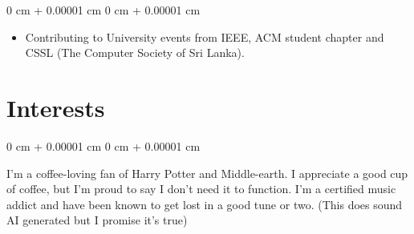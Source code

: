 \documentclass[10pt, letterpaper]{article}
\newenvironment{highlights}{
    \begin{itemize}[
        topsep=0.10 cm,
        parsep=0.10 cm,
        partopsep=0pt,
        itemsep=0pt,
        leftmargin=0 cm + 10pt
    ]
}{
    \end{itemize}
} %
\newenvironment{onecolentry}{
    \begin{adjustwidth}{
        0 cm + 0.00001 cm
    }{
        0 cm + 0.00001 cm
    }
}{
    \end{adjustwidth}
} %
\newenvironment{twocolentry}[2][]{
    \onecolentry
    \def\secondColumn{#2}
    \setcolumnwidth{\fill, 6.5 cm}
    \begin{paracol}{2}
}{
    \switchcolumn \raggedleft \secondColumn
    \end{paracol}
    \endonecolentry
} %
\begin{document}
\begin{twocolentry} {
    
}
    \begin{highlights}
        \item Contributing to University events from IEEE, ACM student chapter and CSSL (The Computer Society of Sri Lanka).
    \end{highlights}
\end{twocolentry}

\section{Interests}



        
        \begin{onecolentry}
            I'm a coffee-loving fan of Harry Potter and Middle-earth. I appreciate a good cup of
coffee, but I'm proud to say I don't need it to function. I'm a certified music addict and
have been known to get lost in a good tune or two.
(This does sound AI generated but I promise it's true)
        \end{onecolentry}
    
\end{document}
